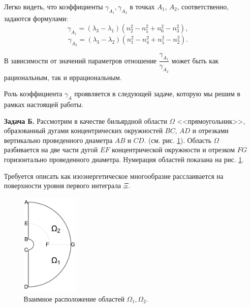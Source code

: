 Легко видеть, что коэффициенты $\gamma_{A_1}, \gamma_{A_2}$ в точках $A_1$, $A_2$, соответственно, задаются формулами:
$$\gamma_{A_1} = (\lambda_3 - \lambda_1)(n_2^2 - n_5^2 + n_6^2 - n_3^2),$$
$$\gamma_{A_2} = (\lambda_3 - \lambda_2)(n_1^2 - n_4^2 + n_5^2 - n_2^2).$$

В зависимости от значений параметров отношение $\dfrac{\gamma_{A_1}}{\gamma_{A_2}}$ может быть как рациональным, так и иррациональным.

Роль коэффициента $\gamma_A$ проявляется в следующей задаче, которую мы решим в рамках настоящей работы.

\textbf{Задача Б.} Рассмотрим в качестве бильярдной области $\Omega$  <<прямоугольник>>, образованный дугами концентрических окружностей $BC$, $AD$ и отрезками вертикально проведенного диаметра $AB$ и $CD$. (см. рис. \ref{fig:pt8:_example9}).
Область $\Omega$ разбивается на две части дугой  $EF$ концентрической окружности  и отрезком $FG$ горизонтально проведенного диаметра. Нумерация областей показана на рис. \ref{fig:pt8:_example9}.

Требуется описать как изоэнергетическое многообразие расслаивается на поверхности уровня первого интеграла $\Xi$.


\begin{figure}[!htb]
\centering
   \includegraphics[width=0.25\textwidth]{images/ch4/section1/imgB.pdf}   
    \caption{Взаимное расположение областей $\Omega_1, \Omega_2$.}
    \label{fig:pt8:_example9}
\end{figure}


\clearpage
